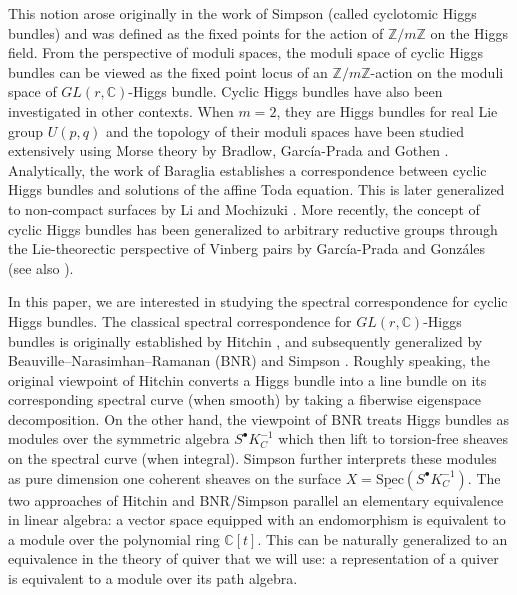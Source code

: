 \documentclass[11pt]{amsart}
\theoremstyle{plain}
\theoremstyle{definition}
\theoremstyle{remark}
\def\C{\mathbb{C}}
\def\Spec{\textrm{Spec}}
\def\zm{\mathbb{Z}/m\mathbb{Z}}
\begin{document}
This notion arose originally in the work of Simpson \cite{Simpson-middleconvolution} (called cyclotomic Higgs bundles) and was defined as the fixed points for the action of $\zm$ on the Higgs field. From the perspective of moduli spaces, the moduli space of cyclic Higgs bundles can be viewed as the fixed point locus of an $\zm$-action on the moduli space of $GL(r,\C)$-Higgs bundle. Cyclic Higgs bundles have also been investigated in other contexts. When $m=2$, they are Higgs bundles for real Lie group $U(p,q)$ and the topology of their moduli spaces have been studied extensively using Morse theory by Bradlow, Garc\'{i}a-Prada and Gothen \cite{bradlow-gp-gothen}. Analytically, the work of Baraglia \cite{baraglia} establishes a correspondence between cyclic Higgs bundles and solutions of the affine Toda equation. This is later generalized to non-compact surfaces by Li and Mochizuki \cite{Li-Mochizuki2}. More recently, the concept of cyclic Higgs bundles has been generalized to arbitrary reductive groups through the Lie-theorectic perspective of Vinberg pairs by Garc\'{i}a-Prada and Gonz\'{a}les \cite{gp-vinberg,Garc_a_Prada_2026} (see also \cite{garcia-ramanan}). 


In this paper, we are interested in studying the spectral correspondence for cyclic Higgs bundles. The classical spectral correspondence for $GL(r,\C)$-Higgs bundles is  originally established by Hitchin \cite{hitchin-stable}, and subsequently generalized by Beauville--Narasimhan--Ramanan (BNR) \cite{bnr} and Simpson \cite{simpsonmoduli}. Roughly speaking, the original viewpoint of Hitchin converts a Higgs bundle into a line bundle on its corresponding spectral curve (when smooth) by taking a fiberwise eigenspace decomposition. On the other hand, the viewpoint of BNR treats Higgs bundles as modules over the symmetric algebra $S^\bullet K_C^{-1}$ which then lift to torsion-free sheaves on the spectral curve (when integral). Simpson further interprets these modules as pure dimension one coherent sheaves on the surface $X=\underline{\Spec}(S^\bullet K_C^{-1})$. The two approaches of Hitchin and BNR/Simpson parallel an elementary equivalence in linear algebra: a vector space equipped with an endomorphism is equivalent to a module over the polynomial ring $\C[t]$. This can be naturally generalized to an equivalence in the theory of quiver that we will use: a representation of a quiver is equivalent to a module over its path algebra.
\end{document}
